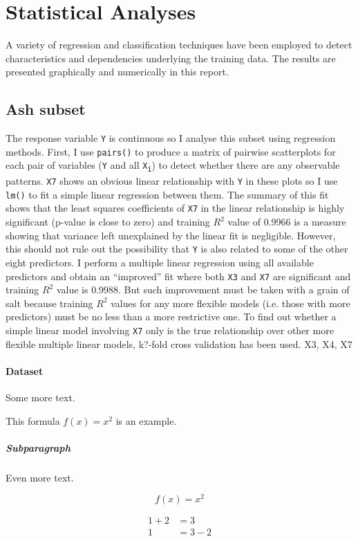 \documentclass{article}
\begin{document}
\section{Statistical Analyses}

A variety of regression and classification techniques have been employed to detect characteristics and dependencies underlying the training data. The results are presented graphically and numerically in this report.

\subsection{Ash subset}

The response variable {\tt Y} is continuous so I analyse this subset using regression methods. First, I use {\tt pairs()} to produce a matrix of pairwise scatterplots for each pair of variables ({\tt Y} and all {\tt X\textsubscript{i}}) to detect whether there are any observable patterns. {\tt X7} shows an obvious linear relationship with {\tt Y} in these plots so I use {\tt lm()} to fit a simple linear regression between them. The summary of this fit shows that the least squares coefficients of {\tt X7} in the linear relationship is highly significant (p-value is close to zero) and training $R^2$ value of 0.9966 is a measure showing that variance left unexplained by the linear fit is negligible. However, this should not rule out the possibility that {\tt Y} is also related to some of the other eight predictors. I perform a multiple linear regression using all available predictors and obtain an ``improved'' fit where both {\tt X3} and {\tt X7} are significant and training $R^2$ value is 0.9988. But such improvement must be taken with a grain of salt because training $R^2$ values for any more flexible models (i.e. those with more predictors) must be no less than a more restrictive one. To find out whether a simple linear model involving {\tt X7} only is the true relationship over other more flexible multiple linear models, k?-fold cross validation has been used.  X3, X4, X7

\paragraph{Dataset}

Some more text.

This formula $f(x) = x^2$ is an example.

\subparagraph{Subparagraph}

Even more text.

\begin{equation*}
  f(x) = x^2
\end{equation*}

\begin{align*}
  1 + 2 &= 3\\
  1 &= 3 - 2
\end{align*}
\end{document}
